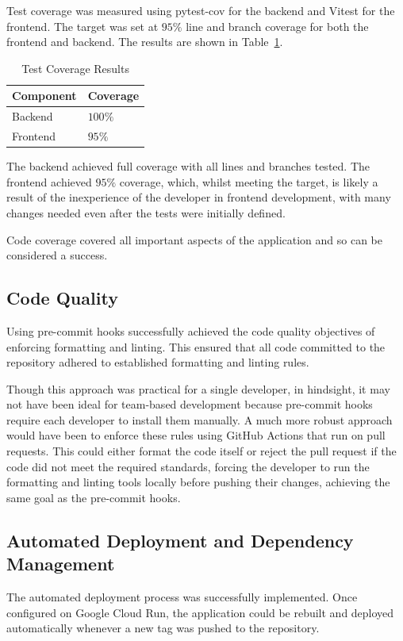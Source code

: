 Test coverage was measured using pytest-cov for the backend and Vitest for the frontend. The target was set at $95\%$ line and branch coverage for both the frontend and backend. The results are shown in Table~\ref{tab:test-coverage-results}.
\begin{table} [H]
    \centering
    \begin{tabular}{|m{3cm}|m{3cm}|}
        \hline
        \textbf{Component} & \textbf{Coverage} \\
        \hline
 Backend & $100\%$ \\
        \hline
 Frontend & $95\%$ \\
        \hline
    \end{tabular}
    \caption{Test Coverage Results}
    \label{tab:test-coverage-results}
\end{table}

The backend achieved full coverage with all lines and branches tested. The frontend achieved $95\%$ coverage, which, whilst meeting the target, is likely a result of the inexperience of the developer in frontend development, with many changes needed even after the tests were initially defined.

Code coverage covered all important aspects of the application and so can be considered a success.
\ifshowappendix
\fi

\subsection{Code Quality}
Using pre-commit hooks successfully achieved the code quality objectives of enforcing formatting and linting. This ensured that all code committed to the repository adhered to established formatting and linting rules.

Though this approach was practical for a single developer, in hindsight, it may not have been ideal for team-based development because pre-commit hooks require each developer to install them manually. A much more robust approach would have been to enforce these rules using GitHub Actions that run on pull requests. This could either format the code itself or reject the pull request if the code did not meet the required standards, forcing the developer to run the formatting and linting tools locally before pushing their changes, achieving the same goal as the pre-commit hooks.

\subsection{Automated Deployment and Dependency Management}
The automated deployment process was successfully implemented. Once configured on Google Cloud Run, the application could be rebuilt and deployed automatically whenever a new tag was pushed to the repository.

